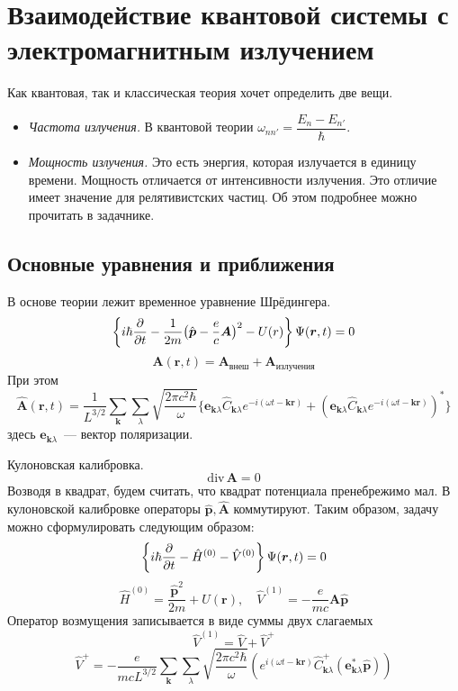 \section{Взаимодействие квантовой системы с электромагнитным излучением}
\def \Ckl {\hat C_{\bf k \lambda}}
Как квантовая, так и классическая теория хочет определить две вещи.
\begin{itemize}
  \item \emph{Частота излучения.} В квантовой теории $\omega_{nn'} = \dfrac{E_n - E_{n'}}{\hbar}$.
  \item \emph{Мощность излучения.} Это есть энергия, которая излучается в единицу времени. Мощность отличается от интенсивности излучения. Это отличие имеет значение для релятивистских частиц. Об этом подробнее можно прочитать в задачнике.
\end{itemize}

\subsection{Основные уравнения и приближения}
В основе теории лежит временное уравнение Шрёдингера.
\def \bf{\boldsymbol}
$$
    \left\{ i \hbar \ud{}{t} - \dfrac{1}{2m} \big(
        \hat {\bf p} - \dfrac{e}{c} \bf A
    \big)^2 - U(r) \right\} \Psi(\bf r, t) = 0
$$
$$
    \bf A(\bf r, t) = \bf A_{\text{внеш}} + \bf A_{\text{излучения}}
$$
При этом
$$
    \hat{\bf A}(\bf r, t) = \dfrac{1}{L^{3/2}} \sum_{\bf k}\sum_{\lambda} \sqrt{\dfrac{2 \pi c^2 \hbar}{\omega}}
    \{
        \bf e_{\bf k \lambda} \Ckl e^{-i(\omega t - \bf k \bf r)} + (\bf e_{\bf k \lambda} \Ckl e^{-i(\omega t - \bf k \bf r)} )^{\ast}
    \}
$$
здесь $\bf e_{\bf k \lambda}$~--- вектор поляризации.

Кулоновская калибровка.
$$
    \mathrm{div}\, \bf A = 0
$$
Возводя в квадрат, будем считать, что квадрат потенциала пренебрежимо мал. В кулоновской калибровке операторы $\hat{\bf p}, \hat{\bf A}$ коммутируют.  Таким образом, задачу можно сформулировать следующим образом:
$$
    \left\{
        i \hbar \ud{}{t} - \hat H^{(0)} - \hat V^{(0)}
    \right\} \Psi(\bf r, t) = 0
$$
$$
    \hat H^{(0)} = \dfrac{\hat{\bf p}^2}{2m} + U(\bf r), \quad \hat V^{(1)} = -\dfrac{e}{mc} \bf A \hat{\bf p}
$$
Оператор возмущения записывается в виде суммы двух слагаемых
$$
    \hat V^{(1)} = \hat V + \hat V^+
$$
$$
    \hat V^{+} = -\dfrac{e}{mc L^{3/2}} \sum_{\bf k} \sum_{\lambda} \sqrt{\dfrac{2 \pi c^2 \hbar}{\omega}}
    \left(
        e^{i (\omega t - \bf k \bf r)} \Ckl^+ (\bf e_{\bf k \lambda}^\ast \hat {\bf p})
    \right)
$$
